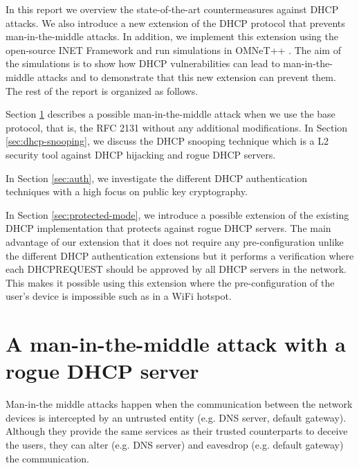 \documentclass[letterpaper, 10 pt, conference]{ieeeconf}  %
\begin{document}
In this report we overview the state-of-the-art countermeasures against DHCP attacks. We also introduce a new extension of the DHCP protocol that prevents man-in-the-middle attacks. In addition, we implement this extension using the open-source INET Framework \cite{inet} and run simulations in OMNeT++ \cite{Varga:2008:OOS:1416222.1416290}. The aim of the simulations is to show how DHCP vulnerabilities can lead to man-in-the-middle attacks and to demonstrate that this new extension can prevent them. The rest of the report is organized as follows.

Section \ref{sec:man-in-the-middle} describes a possible man-in-the-middle attack when we use the base protocol, that is, the RFC 2131 without any additional modifications. In Section \ref{sec:dhcp-snooping}, we discuss the DHCP snooping technique which is a L2 security tool against DHCP hijacking and rogue DHCP servers. 

In Section \ref{sec:auth}, we investigate the different DHCP authentication techniques with a high focus on public key cryptography.

In Section \ref{sec:protected-mode}, we introduce a possible extension of the existing DHCP implementation that protects against rogue DHCP servers. The main advantage of our extension that it does not require any pre-configuration unlike the different DHCP authentication extensions but it performs a verification where each DHCPREQUEST should be approved by all DHCP servers in the network. This makes it possible using this extension where the pre-configuration of the user's device is impossible such as in a WiFi hotspot.
 
\section{A man-in-the-middle attack with a rogue DHCP server}\label{sec:man-in-the-middle}
Man-in-the middle attacks happen when the communication between the network devices is intercepted by an untrusted entity (e.g. DNS server, default gateway). Although they provide the same services as their trusted counterparts to deceive the users, they can alter (e.g. DNS server) and eavesdrop (e.g. default gateway) the communication.
\end{document}
